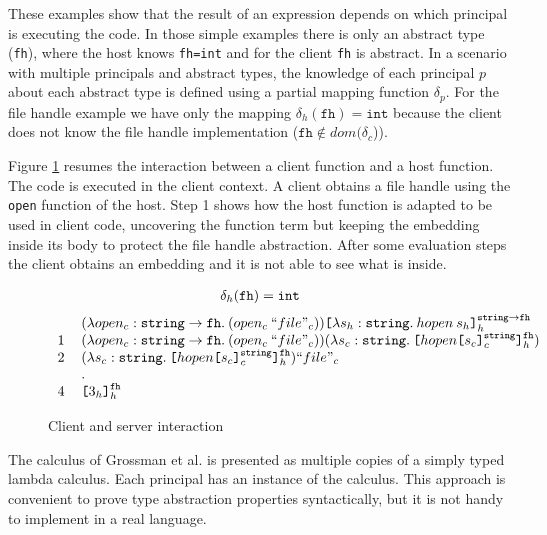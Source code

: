\documentclass{article}
\newcommand{\emb}[3]{\texttt{[}#1\texttt{]}_{#2}^{#3}}
\newcommand{\tslam}[3]{\lambda #1 : #2. \: #3}
\newcommand\icode[1]{\texttt{#1}}
\newcommand\str[0]{{\tt string}}
\begin{document}
	These examples show that the result of an expression depends on which principal is executing the code. In those simple examples there is only an abstract type (\texttt{fh}), where the host knows \icode{fh=int} and for the client \icode{fh} is abstract. In a scenario with multiple principals and abstract types, the knowledge of each principal $p$ about each abstract type is defined using a partial mapping function $\delta_p$. For the file handle example we have only the mapping $\delta_h(\icode{fh})=\icode{int}$ because the client does not know the file handle implementation ($
	\icode{fh} \notin dom(\delta_c$)). 

Figure \ref{fig:client_server_interaction} resumes the interaction between a client function and a host function. The code is executed in the client context.  A client obtains a file handle using the \icode{open} function of the host. Step 1 shows how the host function is adapted to be used in client code, uncovering the function term but keeping the embedding inside its body to protect the file handle abstraction. After some evaluation steps the client obtains an embedding and it is not able to see what is inside.
\begin{figure}[!htbp]
\[
\begin{tabular}{c}
$\delta_h(\texttt{fh}) = \icode{int} $
\end{tabular}
\]
\[
	\begin{tabular}{c l}	
	 & $(\tslam{open_c}{\str{} \rightarrow \icode{fh}}{(open_c \: ``file"_c)}) 
  \emb{\tslam{s_h}{\str{}}{hopen \: s_h} }{h}{\str{}\rightarrow \texttt{fh}} $ \\
  1 & $(\tslam{open_c}{\str{} \rightarrow \icode{fh}}(open_ c \: ``file"_c)) 
  (\tslam{s_c}{\str{}}{\emb{hopen \emb{s_c}{c}{\str{}}}{h}{\texttt{fh}}})  $ \\
  2 & $ (\tslam{s_c}{\str{}}{\emb{hopen \emb{s_c}{c}{\str{}}}{h}{\texttt{fh}}})  ``file"_c $ \\
	& .\\
  4 & $ \emb{3_h}{h}{\texttt{fh}} $	
	\end{tabular}
\]
\caption{Client and server interaction}
		\label{fig:client_server_interaction}
\end{figure}
	
The calculus of Grossman et al. is presented as multiple copies of a simply typed lambda calculus. Each principal has an instance of the calculus. This approach is convenient to prove type abstraction properties syntactically, but it is not handy to implement in a real language. 
\end{document}
